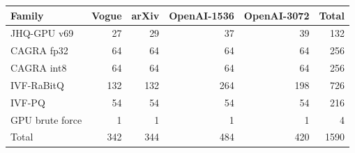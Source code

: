\begin{tabular}{@{}lrrrrr@{}}
\toprule
Family & Vogue & arXiv & OpenAI-1536 & OpenAI-3072 & Total \\
\midrule
JHQ-GPU v69 & 27 & 29 & 37 & 39 & 132 \\
CAGRA fp32 & 64 & 64 & 64 & 64 & 256 \\
CAGRA int8 & 64 & 64 & 64 & 64 & 256 \\
IVF-RaBitQ & 132 & 132 & 264 & 198 & 726 \\
IVF-PQ & 54 & 54 & 54 & 54 & 216 \\
GPU brute force & 1 & 1 & 1 & 1 & 4 \\
\midrule
Total & 342 & 344 & 484 & 420 & 1590 \\
\bottomrule
\end{tabular}
